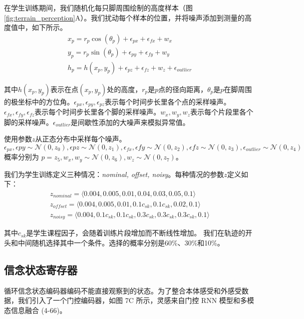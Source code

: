 在学生训练期间，我们随机化每只脚周围绘制的高度样本（图\ref{fig:terrain_perception}A）。我们扰动每个样本的位置，并将噪声添加到测量的高度值中，如下所示。
\begin{align}
  x_p=r_p\cos(\theta_p)+\epsilon_{px}+\epsilon_{fx}+w_x\\
  y_p=r_p\sin(\theta_p)+\epsilon_{py}+\epsilon_{fy}+w_y\\
  h_p=h(x_p,y_p)+\epsilon_{pz}+\epsilon_{fz}+w_z+\epsilon_{outlier}
\end{align}

其中$h(x_p,y_p)$表示在点$(x_p,y_p)$处的高度，$r_p$是$p$点的径向距离，$\theta_p$是$p$在脚周围的极坐标中的方位角。$\epsilon_{px},\epsilon_{py},\epsilon_{pz}$表示每个时间步长里各个点的采样噪声。$\epsilon_{fx},\epsilon_{fy},\epsilon_{fz}$表示每个时间步长里各个脚的采样噪声。$w_x, w_y, w_z$表示每个片段里各个脚的采样噪声。$\epsilon_{outlier}$是间歇性添加的大噪声来模拟异常值。

使用参数$z$从正态分布中采样每个噪声。$\epsilon_{px},\epsilon{py}\sim \mathcal{N}(0,z_0), \epsilon{pz}\sim \mathcal{N}(0,z_1), \epsilon_{fx},\epsilon{fy}\sim \mathcal{N}(0,z_2), \epsilon{fz}\sim \mathcal{N}(0,z_3), \epsilon_{outlier}\sim \mathcal{N}(0,z_4)$ 概率分别为 $p=z_5,w_x,w_y\sim\mathcal{N}(0,z_6),w_z\sim\mathcal{N}(0,z_7)$。

我们为学生训练定义三种情况：\emph{nominal, offset, noisy}。每种情况的参数$z$定义如下：
\begin{align}
  z_{nominal}=\langle0.004, 0.005, 0.01, 0.04, 0.03,0.05, 0.1\rangle\\
  z_{offset}=\langle0.004, 0.005, 0.01, 0.1c_{sk}, 0.1c_{sk},0.02, 0.1\rangle\\
  z_{noisy}=\langle0.004, 0.1c_{sk}, 0.1c_{sk}, 0.3c_{sk}, 0.3c_{sk},0.3c_{sk}, 0.1\rangle
\end{align}

其中$c_{sk}$是学生课程因子，会随着训练片段增加而不断线性增加。
我们在轨迹的开头和中间随机选择其中一个条件。选择的概率分别是60\%、30\%和10\%。


\subsection[信念状态寄存器]{信念状态寄存器}

循环信念状态编码器编码不能直接观察到的状态。为了整合本体感受和外感受数据，我们引入了一个门控编码器，如图 7C 所示，灵感来自门控 RNN 模型\cite[p]{Cho_van_Merrienboer_Gulcehre_Bahdanau_Bougares_Schwenk_Bengio_2014,Hochreiter_Schmidhuber_1997}和多模态信息融合 (4-66)。

